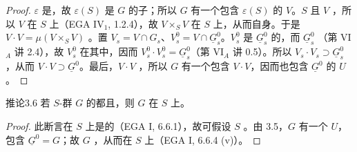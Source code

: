 \begin{proof}
 $\varepsilon$ 是，故 $\varepsilon(S)$ 是 $G$ 的子；所以 $G$ 有一个包含 $\varepsilon(S)$ 的 $V$。$S$ 且 $V$ ，所以 $V$ 在 $S$ 上（EGA IV$_1$, 1.2.4），故 $V\times_SV$ 在 $S$ 上，从而自身。于是 $V\cdot V=\mu(V\times_SV)$ 。置 $V_s=V\cap G_s$、$V_s^0=V\cap\underline G_s^0$。$V_s^0$ 是 $\underline G_s^0$ 的，而 $\underline G_s^0$ （第 VI$_A$ 讲 2.4），故 $V_s^0$ 在其中，因而 $V_s^0\cdot V_s^0=\underline G_s^0$（第 VI$_A$ 讲 0.5）。所以 $V_s\cdot V_s\supset\underline G_s^0$，从而 $V\cdot V\supset\underline G^0$。最后，$V\cdot V$ ，所以 $G$ 有一个包含 $V\cdot V$，因而也包含 $\underline G^0$ 的 $U$。
\end{proof}
\begin{SGAresult}{推论}{3.6}
若 $S$-群 $G$ 的都且，则 $G$ 在 $S$ 上。
\end{SGAresult}
\begin{proof}
此断言在 $S$ 上是的（EGA I, 6.6.1），故可假设 $S$ 。由 3.5，$G$ 有一个 $U$，包含 $\underline G^0=G$；故 $G$ ，从而在 $S$ 上（EGA I, 6.6.4 (v)）。
\end{proof}

